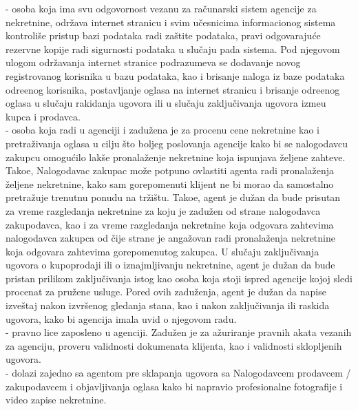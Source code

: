 \documentclass[20pt]{article}
\begin{document}
 - osoba koja ima svu odgovornost vezanu za ra\v{c}unarski sistem agencije za nekretnine, odr\v{z}ava internet stranicu i svim u\v{c}esnicima informacionog sistema kontroli\v{s}e pristup bazi podataka radi za\v{s}tite podataka, pravi odgovaraju\' ce rezervne kopije radi sigurnosti podataka u slu\v{c}aju pada sistema. Pod njegovom ulogom odr\v {z}avanja internet stranice podrazumeva se dodavanje novog registrovanog korisnika u bazu podataka, kao i brisanje naloga iz baze podataka odre\dj enog korisnika, postavljanje oglasa na internet stranicu i brisanje odre\dj enog oglasa u slu\v {c}aju rakidanja ugovora ili u slu\v {c}aju zaklju\v {c}ivanja ugovora izme\dj u kupca i prodavca.\\

 - osoba koja radi u agenciji i zadu\v{z}ena je za procenu cene nekretnine kao i pretra\v{z}ivanja oglasa u cilju \v{s}to boljeg poslovanja agencije kako bi se nalogodavcu zakupcu omogu\' cilo lak\v{s}e pronala\v{z}enje nekretnine koja ispunjava \v{z}eljene zahteve. Tako\dj e, Nalogodavac zakupac mo\v{z}e potpuno ovlastiti agenta radi pronala\v {z}enja \v{z}eljene nekretnine, kako sam gorepomenuti klijent ne bi morao da samostalno pretra\v{z}uje trenutnu ponudu na tr\v{z}i\v{s}tu. Tako\dj e, agent je du\v{z}an da bude prisutan za vreme razgledanja nekretnine za koju je zadu\v {z}en od strane nalogodavca zakupodavca, kao i za vreme razgledanja nekretnine koja odgovara zahtevima nalogodavca zakupca od \v{c}ije strane je anga\v{z}ovan radi pronala\v{z}enja nekretnine koja odgovara zahtevima gorepomenutog zakupca. U slu\v {c}aju zaklju\v {c}ivanja ugovora o kupoprodaji ili o iznajmljivanju nekretnine, agent je du\v{z}an da bude pristan prilikom zaklju\v {c}ivanja istog kao osoba koja stoji ispred agencije kojoj sledi procenat za pru\v {z}ene usluge. Pored ovih zadu\v {z}enja, agent je du\v {z}an da napise izve\v {s}taj nakon izvr\v {s}enog gledanja stana, kao i nakon zaklju\v {c}ivanja ili raskida ugovora, kako bi agencija imala uvid o njegovom radu.\\

 - pravno lice zaposleno u agenciji. Zadu\v{z}en je za a\v{z}uriranje pravnih akata vezanih za agenciju, proveru validnosti dokumenata klijenta, kao i validnosti sklopljenih ugovora.\\ 

 - dolazi zajedno sa agentom pre sklapanja ugovora sa Nalogodavcem prodavcem / zakupodavcem i objavljivanja oglasa kako bi napravio profesionalne fotografije i video zapise nekretnine. 
\end{document}
